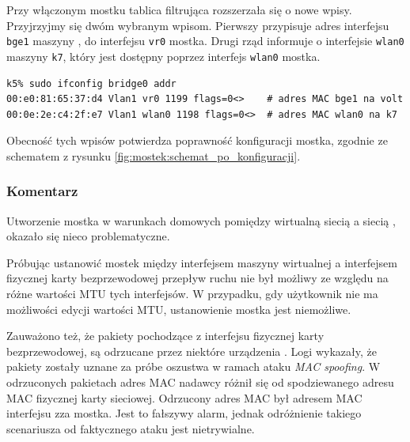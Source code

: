 Przy włączonym mostku tablica filtrująca rozszerzała się o nowe wpisy.
Przyjrzyjmy się dwóm wybranym wpisom. Pierwszy przypisuje adres interfejsu
\texttt{bge1} maszyny \volt{}, do interfejsu \texttt{vr0} mostka. Drugi rząd
informuje o interfejsie \texttt{wlan0} maszyny \texttt{k7}, który jest dostępny
poprzez interfejs \texttt{wlan0} mostka.

\begin{lstlisting}
k5% sudo ifconfig bridge0 addr
00:e0:81:65:37:d4 Vlan1 vr0 1199 flags=0<>    # adres MAC bge1 na volt
00:0e:2e:c4:2f:e7 Vlan1 wlan0 1198 flags=0<>  # adres MAC wlan0 na k7
\end{lstlisting}

Obecność tych wpisów potwierdza poprawność konfiguracji mostka, zgodnie ze
schematem z rysunku \ref{fig:mostek:schemat_po_konfiguracji}.


\subsubsection{Komentarz}

Utworzenie mostka w warunkach domowych pomiędzy wirtualną siecią \eth{} a
siecią \wifi, okazało się nieco problematyczne.

Próbując ustanowić mostek między interfejsem \eth{} maszyny wirtualnej a
interfejsem fizycznej karty bezprzewodowej przepływ ruchu nie był możliwy ze
względu na różne wartości MTU tych interfejsów. W przypadku, gdy użytkownik nie
ma możliwości edycji wartości MTU, ustanowienie mostka jest niemożliwe.

Zauważono też, że pakiety pochodzące z interfejsu fizycznej karty
bezprzewodowej, są odrzucane przez niektóre urządzenia \wifi. Logi wykazały, że
pakiety zostały uznane za próbe oszustwa w ramach ataku \emph{MAC spoofing}. W
odrzuconych pakietach adres MAC nadawcy różnił się od spodziewanego adresu MAC
fizycznej karty sieciowej. Odrzucony adres MAC był adresem MAC interfejsu zza
mostka. Jest to fałszywy alarm, jednak odróżnienie takiego scenariusza od
faktycznego ataku jest nietrywialne.
